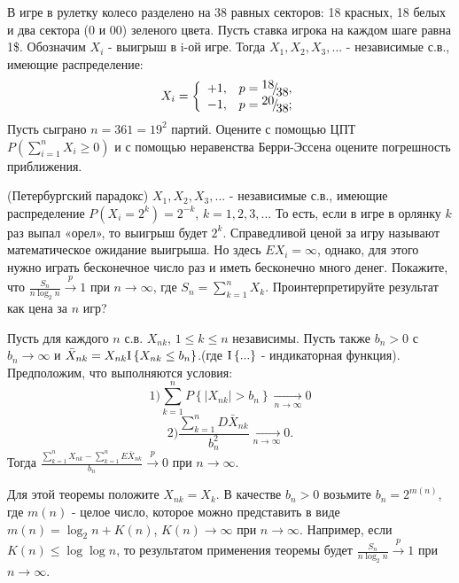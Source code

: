 \begin{problem}
В игре в рулетку колесо разделено на 38 равных секторов: 18 красных, 18 белых и два сектора (0 и 00) зеленого цвета. Пусть ставка игрока на каждом шаге равна 1\$. Обозначим $X_{i} $ - выигрыш в i-ой игре. Тогда $X_{1} ,X_{2} ,X_{3} ,...$ - независимые с.в., имеющие распределение: 
\[X_{i} =\left\{\begin{array}{cc} {+1,} & {p={\raise0.7ex\hbox{$ 18 $}\!\mathord{\left/ {\vphantom {18 38}} \right. \kern-\nulldelimiterspace}\!\lower0.7ex\hbox{$ 38 $}} ,} \\ {-1,} & {p={\raise0.7ex\hbox{$ 20 $}\!\mathord{\left/ {\vphantom {20 38}} \right. \kern-\nulldelimiterspace}\!\lower0.7ex\hbox{$ 38 $}} ;} \end{array}\right. \] 
Пусть сыграно $n=361=19^{2} $ партий. Оцените с помощью ЦПТ $P\left(\sum _{i=1}^{n}X_{i}  \ge 0\right)$ и с помощью неравенства Берри-Эссена оцените погрешность приближения.
\end{problem}

\begin{problem}
(Петербургский парадокс) $X_{1} ,X_{2} ,X_{3} ,...$ - независимые с.в., имеющие распределение $P\left(X_{i} =2^{k} \right)=2^{-k} $, $k=1,2,3,...$ То есть, если в игре в орлянку $k$ раз выпал «орел», то выигрыш будет $2^{k} $. Справедливой ценой за игру называют математическое ожидание выигрыша. Но здесь $EX_{i} =\infty $, однако, для этого нужно играть бесконечное число раз и иметь бесконечно много денег. Покажите, что $\frac{S_{n} }{n\log _{2} n} \mathop{\to }\limits^{p} 1$ при $n\to \infty $, где $S_{n} =\sum _{k=1}^{n}X_{k}  $. Проинтерпретируйте результат как цена за $n$ игр?

\begin{ordre} 

Пусть для каждого $n$ с.в. $X_{nk} $, $1\le k\le n$ независимы. Пусть также $b_{n} >0$ с $b_{n} \to \infty $ и $\bar{X}_{nk} =X_{nk} {\rm I} \left\{X_{nk} \le b_{n} \right\}$.(где ${\rm I} \left\{...\right\}$ - индикаторная функция). Предположим, что выполняются условия:
\[1) \sum _{k=1}^{n}P\left\{\left|X_{nk} \right|>b_{n} \right\} \mathop{\to }\limits_{n\to \infty } 0\] 
\[2) \frac{\sum _{k=1}^{n}D\bar{X}_{nk}  }{b_{n} ^{2} } \mathop{\to }\limits_{n\to \infty } 0.\] 
Тогда $\frac{\sum _{k=1}^{n}X_{nk}  -\sum _{k=1}^{n}E\bar{X}_{nk}  }{b_{n} } \mathop{\to }\limits^{p} 0$ при $n\to \infty $.

\noindent Для этой теоремы положите $X_{nk} =X_{k} $. В качестве $b_{n} >0$ возьмите $b_{n} =2^{m(n)} $, где $m(n)$ - целое число, которое можно представить в виде $m(n)=\log _{2} n+K(n)$, $K(n)\to \infty $ при $n\to \infty $. Например, если $K(n)\le \log \log n$, то результатом применения теоремы будет $\frac{S_{n} }{n\log _{2} n} \mathop{\to }\limits^{p} 1$ при $n\to \infty $.

\end{ordre} 

\end{problem}

